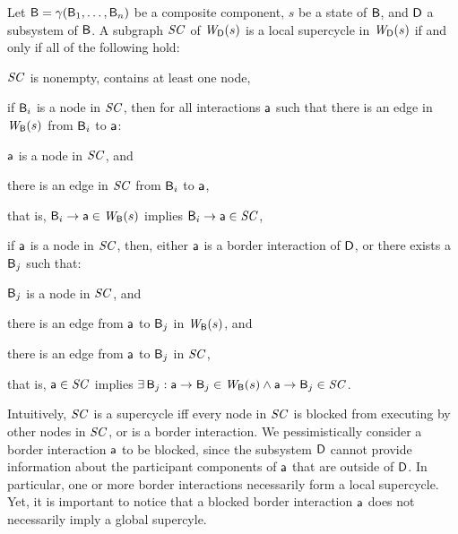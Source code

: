 \begin{definition}
\label{defn:supercycleLoc} 
Let $\B = \gamma(\B_1,\dots,\B_n)$ be a composite component, $s$ be a state of $\B$, and $\DS$ a subsystem
of $\B$.
A subgraph $\SC$ of  $\lwfg{B}{s}{\DS}$ is a local supercycle in $\lwfg{B}{s}{\DS}$ if and only if all of the following hold:
\begin{nlst1}
   \item $\SC$ is nonempty, \ie contains at least one node,

   \item if $\B_i$ is a node in $\SC$, then for all interactions $\act$ such that
there is an edge in $\wfg{\B}{s}$ from $\B_i$ to $\act$:
      \begin{nlst2}
      \item $\act$ is a node in $\SC$, and 
      \item there is an edge in $\SC$ from $\B_i$ to $\act$,
      \end{nlst2}
that is, $\B_i \ar \act \in \wfg{\B}{s}$ implies $\B_i \ar \act \in \SC$,

   \item 
if $\act$ is a node in $\SC$, then, either $\act$ is a border interaction of $\DS$, or  there exists a $\B_j$ such that:
      \begin{nlst2}
      \item $\B_j$  is a node in $\SC$, and
      \item there is an edge from $\act$ to $\B_j$ in $\wfg{\B}{s}$, and
      \item there is an edge from $\act$ to $\B_j$ in $\SC$,
      \end{nlst2}
that is, $\act \in \SC$ implies $\ex \B_j : \act \ar \B_j \in \wfg{\B}{s} \land \act \ar \B_j \in \SC$.

\end{nlst1}
\end{definition}
Intuitively, $\SC$ is a supercycle iff every node in $\SC$ is blocked from executing by other nodes in $\SC$, or is a border interaction. We pessimistically consider a border
interaction $\act$ to be blocked, since the subsystem $\DS$ cannot provide information about the participant components of $\act$ that are outside of
$\DS$. In particular, one or more border interactions necessarily form a local supercycle. Yet, it is important to notice that a blocked border interaction $\act$ does
not necessarily imply a global supercyle.


